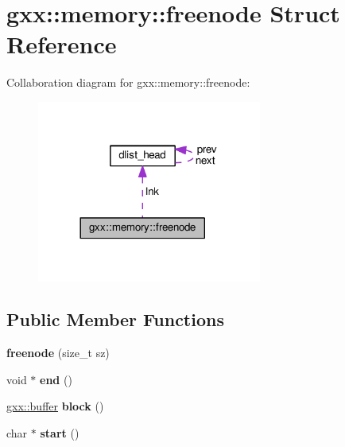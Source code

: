 \hypertarget{structgxx_1_1memory_1_1freenode}{}\section{gxx\+:\+:memory\+:\+:freenode Struct Reference}
\label{structgxx_1_1memory_1_1freenode}


Collaboration diagram for gxx\+:\+:memory\+:\+:freenode\+:
\nopagebreak
\begin{figure}[H]
\begin{center}
\leavevmode
\includegraphics[width=209pt]{structgxx_1_1memory_1_1freenode__coll__graph}
\end{center}
\end{figure}
\subsection*{Public Member Functions}
\begin{DoxyCompactItemize}
\item 
{\bfseries freenode} (size\+\_\+t sz)\hypertarget{structgxx_1_1memory_1_1freenode_ad0347eea2ad0019ed0186e27a8e43860}{}\label{structgxx_1_1memory_1_1freenode_ad0347eea2ad0019ed0186e27a8e43860}

\item 
void $\ast$ {\bfseries end} ()\hypertarget{structgxx_1_1memory_1_1freenode_ab7a8df6c3ce18705a14eaf00251f3eea}{}\label{structgxx_1_1memory_1_1freenode_ab7a8df6c3ce18705a14eaf00251f3eea}

\item 
\hyperlink{classgxx_1_1buffer}{gxx\+::buffer} {\bfseries block} ()\hypertarget{structgxx_1_1memory_1_1freenode_aff775a886fae3feae7854b3333849589}{}\label{structgxx_1_1memory_1_1freenode_aff775a886fae3feae7854b3333849589}

\item 
char $\ast$ {\bfseries start} ()\hypertarget{structgxx_1_1memory_1_1freenode_a409fc63cb292df61e0bd8002261edc55}{}\label{structgxx_1_1memory_1_1freenode_a409fc63cb292df61e0bd8002261edc55}

\end{DoxyCompactItemize}
